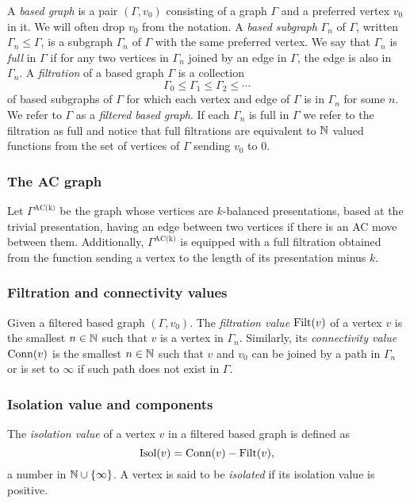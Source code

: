 A \textit{based graph} is a pair $(\Gamma, v_0)$ consisting of a graph $\Gamma$ and a preferred vertex $v_0$ in it.
We will often drop $v_0$ from the notation.
A \textit{based subgraph} $\Gamma_n$ of $\Gamma$, written $\Gamma_n \leq \Gamma$, is a subgraph $\Gamma_n$ of $\Gamma$ with the same preferred vertex.
We say that $\Gamma_n$ is \textit{full} in $\Gamma$ if for any two vertices in $\Gamma_n$ joined by an edge in $\Gamma$, the edge is also in $\Gamma_n$.
A \textit{filtration} of a based graph $\Gamma$ is a collection
\[
\Gamma_0 \leq \Gamma_1 \leq \Gamma_2 \leq \dotsb
\]
of based subgraphs of $\Gamma$ for which each vertex and edge of $\Gamma$ is in $\Gamma_n$ for some $n$.
We refer to $\Gamma$ as a \textit{filtered based graph}.
If each $\Gamma_n$ is full in $\Gamma$ we refer to the filtration as full and notice that full filtrations are equivalent to $\mathbb{N}$ valued functions from the set of vertices of $\Gamma$ sending $v_0$ to $0$.

\subsubsection{The AC graph}

Let $\Gamma^{\text{AC(k)}}$ be the graph whose vertices are $k$-balanced presentations, based at the trivial presentation, having an edge between two vertices if there is an AC move between them.
Additionally, $\Gamma^{\text{AC(k)}}$ is equipped with a full filtration obtained from the function sending a vertex to the length of its presentation minus $k$.

\subsubsection{Filtration and connectivity values}

Given a filtered based graph $(\Gamma, v_0)$.
The \textit{filtration value} $\operatorname{Filt}(v)$ of a vertex $v$ is the smallest $n \in \mathbb{N}$ such that $v$ is a vertex in $\Gamma_n$.
Similarly, its \textit{connectivity value} $\operatorname{Conn}(v)$ is the smallest $n \in \mathbb{N}$ such that $v$ and $v_0$ can be joined by a path in $\Gamma_n$ or is set to $\infty$ if such path does not exist in $\Gamma$.

\subsubsection{Isolation value and components}

The \textit{isolation value} of a vertex $v$ in a filtered based graph is defined as
\[
\operatorname{Isol}(v) = \operatorname{Conn}(v) - \operatorname{Filt}(v),
\]
a number in $\mathbb{N} \cup \{\infty\}$.
A vertex is said to be \textit{isolated} if its isolation value is positive.

